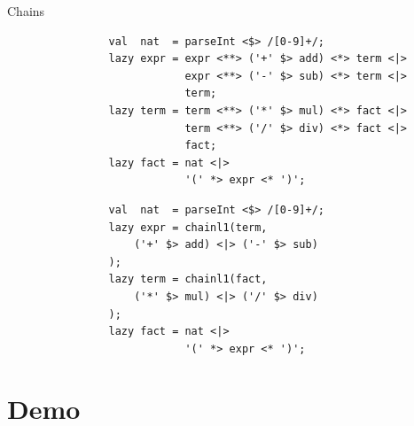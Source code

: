 \documentclass[aspectratio=169]{beamer}
\begin{document}
    \begin{frame}[fragile]{Chains}
        \begin{overprint}
            \begin{verbatim}
                val  nat  = parseInt <$> /[0-9]+/;
                lazy expr = expr <**> ('+' $> add) <*> term <|>
                            expr <**> ('-' $> sub) <*> term <|>
                            term;
                lazy term = term <**> ('*' $> mul) <*> fact <|>
                            term <**> ('/' $> div) <*> fact <|>
                            fact;
                lazy fact = nat <|>
                            '(' *> expr <* ')';
            \end{verbatim}
            \begin{verbatim}
                val  nat  = parseInt <$> /[0-9]+/;
                lazy expr = chainl1(term,
                    ('+' $> add) <|> ('-' $> sub)
                );
                lazy term = chainl1(fact,
                    ('*' $> mul) <|> ('/' $> div)
                );
                lazy fact = nat <|>
                            '(' *> expr <* ')';
            \end{verbatim}
        \end{overprint}
    \end{frame}
    \section{Demo}
\end{document}
